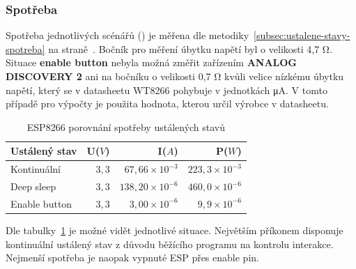 \documentclass[a4paper, 12pt]{report}
\begin{document}
    \subsubsection{Spotřeba}
    Spotřeba jednotlivých scénářů () je měřena dle metodiky~\ref{subsec:ustalene-stavy-spotreba} na straně~\pageref{subsec:ustalene-stavy-spotreba}.
    Bočník pro měření úbytku napětí byl o velikosti 4,7 \si{\ohm}. \\
    Situace \textbf{enable button} nebyla možná změřit zařízením \textbf{ANALOG DISCOVERY 2} ani na bočníku o velikosti 0,7 \si{\ohm} kvůli velice nízkému úbytku napětí, který se v datasheetu WT8266 pohybuje v jednotkách \si{\micro A}.
    V tomto případě pro výpočty je použita hodnota, kterou určil výrobce v datasheetu.
    \begin{table}[h]
        \centering
        \caption{ESP8266 porovnání spotřeby ustálených stavů}
        \begin{tabular}{||l|r r r||}
            \hline
            Ustálený stav & U($V$) & I($A$)                  & P($W$)                 \\
            \hline
            Kontinuální   & $3,3$  & $67,66 \times 10^{-3}$  & $223,3 \times 10^{-3}$ \\
            Deep sleep    & $3,3$  & $138,20 \times 10^{-6}$ & $460,0 \times 10^{-6}$ \\
            Enable button & $3,3$  & $3,00\times 10^{-6}$    & $9,9\times 10^{-6}$    \\
            \hline
        \end{tabular}
        \label{tab:esp8266-klidove-rezimy-spotreba}
    \end{table}
    Dle tabulky~\ref{tab:esp8266-klidove-rezimy-spotreba} je možné vidět jednotlivé situace.
    Největším příkonem disponuje kontinuální ustálený stav z důvodu běžícího programu na kontrolu interakce.
    Nejmenší spotřeba je naopak vypnuté ESP přes enable pin. \\
\end{document}
